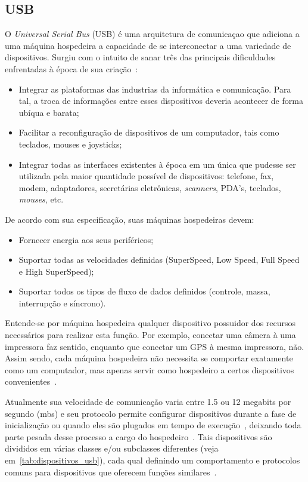 \subsection{USB}

O \emph{Universal Serial Bus} (USB) é uma arquitetura de comunicaçao que adiciona a uma máquina hospedeira a capacidade de se interconectar a uma variedade de dispositivos. Surgiu com o intuito de sanar três das principais dificuldades enfrentadas à época de sua criação~\cite{usbspec}:

\begin{itemize}
	\item Integrar as plataformas das industrias da informática e comunicação. Para tal, a troca de informações entre esses dispositivos deveria acontecer de forma ubíqua e barata;
	\item Facilitar a reconfiguração de dispositivos de um computador, tais como teclados, mouses e joysticks;
	\item Integrar todas as interfaces existentes à época em um única que pudesse ser utilizada pela maior quantidade possível de dispositivos: telefone, fax, modem, adaptadores, secretárias eletrônicas, \emph{scanners}, PDA's, teclados, \emph{mouses}, etc.
\end{itemize}

De acordo com sua especificação, suas máquinas hospedeiras devem:

\begin{itemize}
	\item Fornecer energia aos seus periféricos;
	\item Suportar todas as velocidades definidas (SuperSpeed, Low Speed, Full Speed e High SuperSpeed);
	\item Suportar todos os tipos de fluxo de dados definidos (controle, massa, interrupção e síncrono).
\end{itemize}

Entende-se por máquina hospedeira qualquer dispositivo possuidor dos recursos necessários para realizar esta função. Por exemplo, conectar uma câmera à uma impressora faz sentido, enquanto que conectar um GPS à mesma impressora, não. Assim sendo, cada máquina hospedeira não necessita se comportar exatamente como um computador, mas apenas servir como hospedeiro a certos dispositivos convenientes~\cite{usb3spec}.

Atualmente sua velocidade de comunicação varia entre 1.5 ou 12 megabits por segundo (mbs) e seu protocolo permite configurar dispositivos durante a fase de inicialização ou quando eles são plugados em tempo de execução~\cite{hid}, deixando toda parte pesada desse processo a cargo do hospedeiro~\cite{usb3spec}. Tais dispositivos são divididos em várias classes e/ou subclasses diferentes (veja em~\ref{tab:dispositivos_usb}), cada qual definindo um comportamento e protocolos comuns para dispositivos que oferecem funções similares~\cite{hid}.

